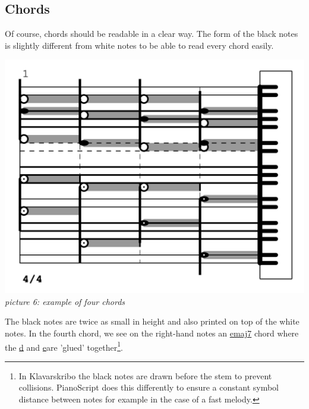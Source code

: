 \documentclass[11pt,a4paper]{article}
\begin{document}
\subsection{Chords}
Of course, chords should be readable in a clear way. The form of the black notes is slightly different from white notes to be able to read every chord easily.
\begin{center}
\includegraphics[scale=.75]{images/chords.jpg}\\
\emph{\small picture 6: example of four chords} 
\end{center}

The black notes are twice as small in height and also printed on top of the white notes. In the fourth chord, we see on the right-hand notes an \underline{e\musFlat maj7} chord where the \underline{d} and \underline{e\musFlat}\space are 'glued' together\footnote{In Klavarskribo the black notes are drawn before the stem to prevent collisions. PianoScript does this differently to ensure a constant symbol distance between notes for example in the case of a fast melody.}.

\end{document}
